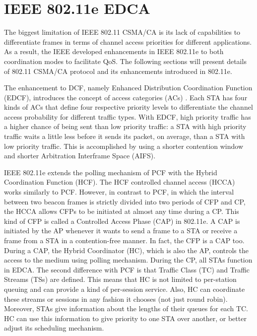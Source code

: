 \section{IEEE 802.11e EDCA}
\label{80211e}

The biggest limitation of IEEE 802.11 CSMA/CA is its lack of capabilities to differentiate frames in terms of channel access priorities for different applications. As a result, the IEEE developed enhancements in IEEE 802.11e to both coordination modes to facilitate QoS. The following sections will present details of 802.11 CSMA/CA protocol and its enhancements introduced in 802.11e. 

The enhancement to DCF, namely Enhanced Distribution Coordination Function (EDCF), introduces the concept of access categories (ACs) \cite{80211}. Each STA has four kinds of ACs that define four respective priority levels to differentiate the channel access probability for different traffic types. With EDCF, high priority traffic has a higher chance of being sent than low priority traffic: a STA with high priority traffic waits a little less before it sends its packet, on average, than a STA with low priority traffic. This is accomplished by using a shorter contention window and shorter Arbitration Interframe Space (AIFS).

IEEE 802.11e extends the polling mechanism of PCF with the Hybrid Coordination Function (HCF). The HCF controlled channel access (HCCA) works similarly to PCF. However, in contrast to PCF, in which the interval between two beacon frames is strictly divided into two periods of CFP and CP, the HCCA allows CFPs to be initiated at almost any time during a CP. This kind of CFP is called a Controlled Access Phase (CAP) in 802.11e. A CAP is initiated by the AP whenever it wants to send a frame to a STA or receive a frame from a STA in a contention-free manner. In fact, the CFP is a CAP too. During a CAP, the Hybrid Coordinator (HC), which is also the AP, controls the access to the medium using polling mechanism. During the CP, all STAs function in EDCA. The second difference with PCF is that Traffic Class (TC) and Traffic Streams (TSs) are defined. This means that HC is not limited to per-station queuing and can provide a kind of per-session service. Also, HC can coordinate these streams or sessions in any fashion it chooses (not just round robin). Moreover, STAs give information about the lengths of their queues for each TC. HC can use this information to give priority to one STA over another, or better adjust its scheduling mechanism.

